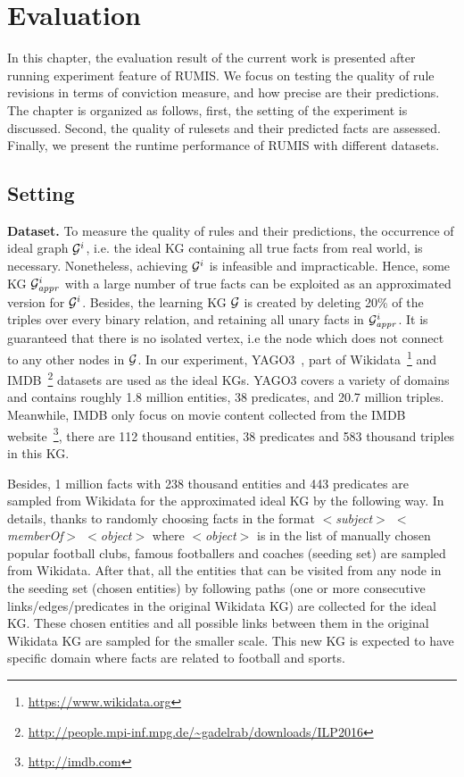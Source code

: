 \chapter{Evaluation}
\label{chap:eval}

In this chapter, the evaluation result of the current work is presented after running experiment feature of RUMIS. We focus on testing the quality of rule revisions in terms of conviction measure, and how precise are their predictions. The chapter is organized as follows, first, the setting of the experiment is discussed. Second, the quality of rulesets and their predicted facts are assessed. Finally, we present the runtime performance of RUMIS with different datasets.

\section{Setting}

\textbf{Dataset.} To measure the quality of rules and their predictions, the occurrence of ideal graph $\mathcal{G}^i$, i.e. the ideal KG containing all true facts from real world, is necessary. Nonetheless, achieving $\mathcal{G}^i$ is infeasible and impracticable. Hence, some KG $\mathcal{G}^i_{\mathit{appr}}$ with a large number of true facts can be exploited as an approximated version for $\mathcal{G}^i$. Besides, the learning KG $\mathcal{G}$ is created by deleting 20\% of the triples over every binary relation, and retaining all unary facts in $\mathcal{G}^i_{\mathit{appr}}$. It is guaranteed that there is no isolated vertex, i.e the node which does not connect to any other nodes in $\mathcal{G}$. In our experiment, YAGO3~\cite{ref28}, part of Wikidata~\footnote{\url{https://www.wikidata.org}} and IMDB~\footnote{\url{http://people.mpi-inf.mpg.de/~gadelrab/downloads/ILP2016}} datasets are used as the ideal KGs. YAGO3 covers a variety of domains and contains roughly 1.8 million entities, 38 predicates, and 20.7 million triples. Meanwhile, IMDB only focus on movie content collected from the IMDB website~\footnote{\url{http://imdb.com}}, there are 112 thousand entities, 38 predicates and 583 thousand triples in this KG.

Besides, 1 million facts with 238 thousand entities and 443 predicates are sampled from Wikidata for the approximated ideal KG by the following way. In details, thanks to randomly choosing facts in the format \textit{$<$subject$>$ $<$memberOf$>$ $<$object$>$} where \textit{$<$object$>$} is in the list of manually chosen popular football clubs, famous footballers and coaches (seeding set) are sampled from Wikidata. After that, all the entities that can be visited from any node in the seeding set (chosen entities) by following paths (one or more consecutive links/edges/predicates in the original Wikidata KG) are collected for the ideal KG. These chosen entities and all possible links between them in the original Wikidata KG are sampled for the smaller scale. This new KG is expected to have specific domain where facts are related to football and sports.

